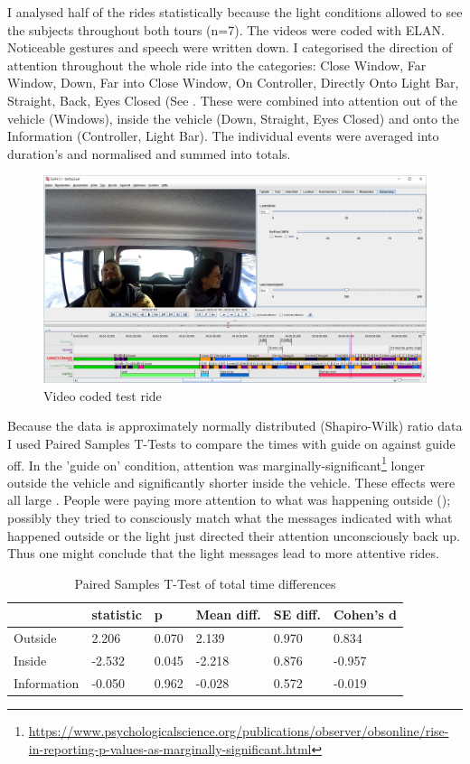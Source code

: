 I analysed half of the rides statistically because the light conditions allowed to see the subjects throughout both tours (n=7). The videos were coded with ELAN\cite{Wittenburg2006ELAN:Research}. Noticeable gestures and speech were written down. I categorised the direction of attention throughout the whole ride into the categories: Close Window, Far Window, Down, Far into Close Window, On Controller, Directly Onto Light Bar, Straight, Back, Eyes Closed (See . These were combined into attention out of the vehicle (Windows), inside the vehicle (Down, Straight, Eyes Closed) and onto the Information (Controller, Light Bar). The individual events were averaged into duration's and normalised and summed into totals.
\begin{figure}
    \includegraphics[width=1\textwidth]{fig/StefSas.JPG}
    \caption[Video Coding]{Video coded test ride}
    \label{fig:videocode}
\end{figure}
Because the data is approximately normally distributed (Shapiro-Wilk) ratio data I used Paired Samples T-Tests to compare the times with guide on against guide off. In the 'guide on' condition, attention was marginally-significant\footnote{\url{https://www.psychologicalscience.org/publications/observer/obsonline/rise-in-reporting-p-values-as-marginally-significant.html}} longer outside the vehicle and significantly shorter inside the vehicle. These effects were all large . People were paying more attention to what was happening outside (); possibly they tried to consciously match what the messages indicated with what happened outside or the light just directed their attention unconsciously back up. Thus one might conclude that the light messages lead to more attentive rides. 

\begin{table}[]
\label{tab:totalVideo}
  \caption{Paired Samples T-Test of total time differences}
\begin{tabular}{@{}llllll@{}}
\toprule
 & statistic &  p & Mean diff. & SE diff. & Cohen's d \\ \midrule
Outside & 2.206 &  0.070 & 2.139 & 0.970 & 0.834 \\
Inside & -2.532 &  0.045 & -2.218 & 0.876 & -0.957 \\
Information & -0.050 &  0.962 & -0.028 & 0.572 & -0.019 \\ \bottomrule
\end{tabular}
\end{table}

